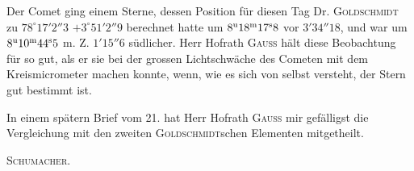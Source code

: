 Der Comet ging einem Sterne, dessen Position für diesen Tag Dr. \textsc{Goldschmidt} zu $78^\circ17'2''3$ $+3^\circ51'2''9$ berechnet hatte um $8^{\rm u}18^{\rm m}17^{\rm s}8$ vor $3'34''18$, und war um $8^{\rm u}10^{\rm m}44^{\rm s}5$ m. Z. $1'15''6$ südlicher. Herr Hofrath \textsc{Gauss} hält diese Beobachtung für so gut, als er sie bei der grossen Lichtschwäche des Cometen mit dem Kreismicrometer machen konnte, wenn, wie es sich von selbst versteht, der Stern gut bestimmt ist.

In einem spätern Brief vom 21. hat Herr Hofrath \textsc{Gauss} mir gefälligst die Vergleichung mit den zweiten \textsc{Goldschmidt}schen Elementen mitgetheilt.
\begin{flushright}\textsc{Schumacher.}\end{flushright}
\clearpage
\endgroup
